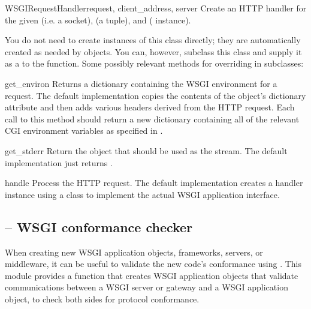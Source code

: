 \begin{classdesc}{WSGIRequestHandler}{request, client_address, server}
Create an HTTP handler for the given  (i.e. a socket),
 (a  tuple), and
 ( instance).

You do not need to create instances of this class directly; they are
automatically created as needed by  objects.  You
can, however, subclass this class and supply it as a 
to the  function.  Some possibly relevant
methods for overriding in subclasses:

\begin{methoddesc}{get_environ}{}
Returns a dictionary containing the WSGI environment for a request.  The
default implementation copies the contents of the 
object's  dictionary attribute and then adds
various headers derived from the HTTP request.  Each call to this method
should return a new dictionary containing all of the relevant CGI
environment variables as specified in .
\end{methoddesc}

\begin{methoddesc}{get_stderr}{}
Return the object that should be used as the  stream.
The default implementation just returns .
\end{methoddesc}

\begin{methoddesc}{handle}{}
Process the HTTP request.  The default implementation creates a handler
instance using a  class to implement the actual
WSGI application interface.
\end{methoddesc}

\end{classdesc}









\subsection{ -- WSGI conformance checker}
When creating new WSGI application objects, frameworks, servers, or
middleware, it can be useful to validate the new code's conformance
using .  This module provides a function that
creates WSGI application objects that validate communications between
a WSGI server or gateway and a WSGI application object, to check both
sides for protocol conformance.

